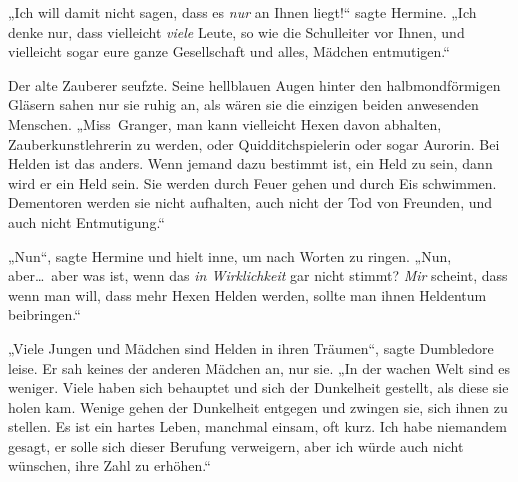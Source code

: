 „Ich will damit nicht sagen, dass es \emph{nur} an Ihnen liegt!“ sagte Hermine.
„Ich denke nur, dass vielleicht \emph{viele} Leute, so wie die Schulleiter vor Ihnen, und vielleicht sogar eure ganze Gesellschaft und alles, Mädchen entmutigen.“

Der alte Zauberer seufzte. Seine hellblauen Augen hinter den halbmondförmigen Gläsern sahen nur sie ruhig an, als wären sie die einzigen beiden anwesenden Menschen.
„Miss~Granger, man kann vielleicht Hexen davon abhalten, Zauberkunstlehrerin zu werden, oder Quidditchspielerin oder sogar Aurorin. Bei Helden ist das anders. Wenn jemand dazu bestimmt ist, ein Held zu sein, dann wird er ein Held sein. Sie werden durch Feuer gehen und durch Eis schwimmen. Dementoren werden sie nicht aufhalten, auch nicht der Tod von Freunden, und auch nicht Entmutigung.“

„Nun“, sagte Hermine und hielt inne, um nach Worten zu ringen.
„Nun, aber…~aber was ist, wenn das \emph{in Wirklichkeit} gar nicht stimmt? \emph{Mir} scheint, dass wenn man will, dass mehr Hexen Helden werden, sollte man ihnen Heldentum beibringen.“

„Viele Jungen und Mädchen sind Helden in ihren Träumen“, sagte Dumbledore leise. Er sah keines der anderen Mädchen an, nur sie.
„In der wachen Welt sind es weniger. Viele haben sich behauptet und sich der Dunkelheit gestellt, als diese sie holen kam. Wenige gehen der Dunkelheit entgegen und zwingen sie, sich ihnen zu stellen. Es ist ein hartes Leben, manchmal einsam, oft kurz. Ich habe niemandem gesagt, er solle sich dieser Berufung verweigern, aber ich würde auch nicht wünschen, ihre Zahl zu erhöhen.“

